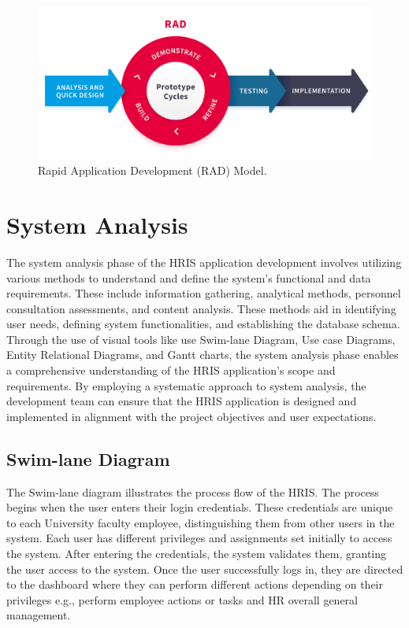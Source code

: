 \begin{figure}[H]
    \centering
    \includegraphics[width=1\linewidth]{figures/images/rad.png}
    \caption{Rapid Application Development (RAD) Model.}
    \label{fig:rad}
\end{figure}
    
\section{System Analysis}
The system analysis phase of the HRIS application development involves utilizing various methods to understand and define the system's functional and data requirements. These include information gathering, analytical methods, personnel consultation assessments, and content analysis. These methods aid in identifying user needs, defining system functionalities, and establishing the database schema. Through the use of visual tools like use Swim-lane Diagram, Use case Diagrams, Entity Relational Diagrams, and Gantt charts, the system analysis phase enables a comprehensive understanding of the HRIS application's scope and requirements. By employing a systematic approach to system analysis, the development team can ensure that the HRIS application is designed and implemented in alignment with the project objectives and user expectations.

    \subsection{Swim-lane Diagram}
    The Swim-lane diagram illustrates the process flow of the HRIS. The process begins when the user enters their login credentials. These credentials are unique to each University faculty employee, distinguishing them from other users in the system. Each user has different privileges and assignments set initially to access the system. After entering the credentials, the system validates them, granting the user access to the system. Once the user successfully logs in, they are directed to the dashboard where they can perform different actions depending on their privileges e.g., perform employee actions or tasks and HR overall general management.

